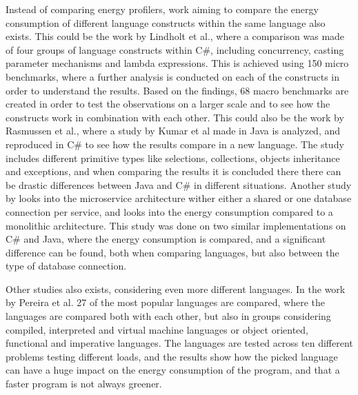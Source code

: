 Instead of comparing energy profilers, work aiming to compare the energy consumption of different language constructs within the same language also exists. This could be the work by Lindholt et al.\cite[]{Lindholt2022}, where a comparison was made of four groups of language constructs within C\#, including concurrency, casting parameter mechanisms and lambda expressions. This is achieved using 150 micro benchmarks, where a further analysis is conducted on each of the constructs in order to understand the results. Based on the findings, 68 macro benchmarks are created in order to test the observations on a larger scale and to see how the constructs work in combination with each other. This could also be the work by Rasmussen et al.\cite[]{Rasmussen2021}, where a study by Kumar et al\cite[]{Kumar2017} made in Java is analyzed, and reproduced in C\# to see how the results compare in a new language. The study includes different primitive types like selections, collections, objects inheritance and exceptions, and when comparing the results it is concluded there there can be drastic differences between Java and C\# in different situations. Another study by \cite[]{Theilmann2022} looks into the microservice architecture wither either a shared or one database connection per service, and looks into the energy consumption compared to a monolithic architecture. This study was done on two similar implementations on C\# and Java, where the energy consumption is compared, and a significant difference can be found, both when comparing languages, but also between the type of database connection.

Other studies also exists, considering even more different languages. In the work by Pereira et al.\cite[]{Pereira2017} 27 of the most popular languages are compared, where the languages are compared both with each other, but also in groups considering compiled, interpreted and virtual machine languages or object oriented, functional and imperative languages. The languages are tested across ten different problems testing different loads, and the results show how the picked language can have a huge impact on the energy consumption of the program, and that a faster program is not always greener.
